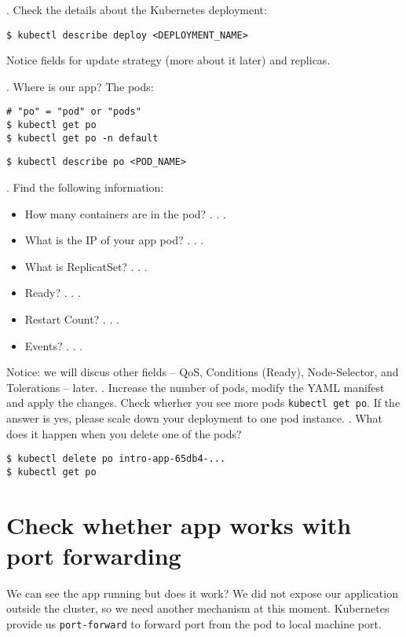\documentclass[12pt, letterpaper]{article}
\begin{document}
. Check the details about the Kubernetes deployment:

\begin{verbatim}
$ kubectl describe deploy <DEPLOYMENT_NAME>
\end{verbatim}

Notice fields for update strategy (more about it later) and replicas.

. Where is our app? The pods:

\begin{verbatim}
# "po" = "pod" or "pods"
$ kubectl get po
$ kubectl get po -n default
\end{verbatim}

\begin{verbatim}
$ kubectl describe po <POD_NAME>
\end{verbatim}

. Find the following information:
\begin{itemize}
    \item How many containers are in the pod? . . .
    \item What is the IP of your app pod? . . .
    \item What is ReplicatSet? . . .
    \item Ready? . . .
    \item Restart Count? . . .
    \item Events? . . .
\end{itemize}

Notice: we will discus other fields -- QoS, Conditions (Ready), Node-Selector, and Tolerations -- later.
%
. Increase the number of pods, modify the {\small YAML} manifest and apply the changes. Check wherher you see more pods \verb|kubectl get po|. If the answer is yes, please scale down your deployment to one pod instance.
%
. What does it happen when you delete one of the pods? 
\begin{verbatim}
$ kubectl delete po intro-app-65db4-...
$ kubectl get po
\end{verbatim}

\section{Check whether app works with port forwarding}

We can see the app running but does it work? We did not expose our application outside the cluster, so we need another mechanism at this moment. Kubernetes provide us \verb|port-forward| to forward port from the pod to local machine port.
\end{document}
